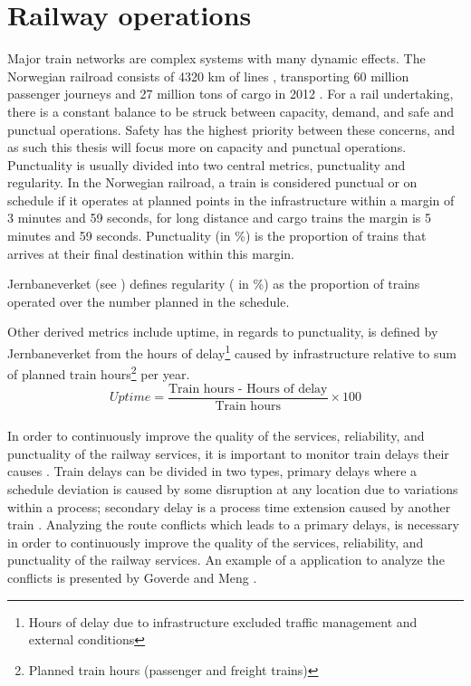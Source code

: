 
\section{Railway operations} %
\label{sec:railway_operations}
Major train networks are complex systems with many dynamic effects. The 
Norwegian railroad consists of 4320 km of lines 
\cite[p. 4]{jernbaneverketStatistikk}, transporting 60 million passenger 
journeys and 27 million tons of cargo in 2012
\cite[p. 9]{jernbaneverketStatistikk}. For a rail undertaking, there is a 
constant balance to be struck between capacity, demand, and safe and punctual 
operations. Safety has the highest priority between these concerns, and as 
such this thesis will focus more on capacity and punctual operations.\\

Punctuality is usually divided into two central metrics, punctuality and 
regularity. In the Norwegian railroad, a train is considered punctual or on 
schedule if it operates at planned points in the infrastructure within a 
margin of 3 minutes and 59 seconds, for long distance and cargo trains the 
margin is 5 minutes and 59 seconds. Punctuality (in \%) is the proportion of 
trains that arrives at their final destination within this margin.

Jernbaneverket (see ) defines regularity (
in \%) as the proportion of trains operated over the number planned in the 
schedule. 

Other derived metrics include uptime, in regards to punctuality, is defined by 
Jernbaneverket from 
the hours of delay\footnote{Hours of delay due to infrastructure excluded 
traffic	management and external conditions} caused by infrastructure relative 
to sum of planned train hours\footnote{Planned train hours (passenger and 
freight trains)} per year.\cite{jernbaneverketPunklighetsTall}
\begin{equation} \label{eq:uptime}
		Uptime =
		\frac
				{
					\text{Train hours - Hours of delay}
				}
				{
					\text{Train hours}
				}\times 100 
\end{equation}\\

In order to continuously improve the quality of the
services, reliability, and punctuality of the railway services, it is important
to monitor train delays their causes  \cite{goverde2011advanced}. 
Train delays can be divided in two types, primary delays where a schedule 
deviation is caused by some disruption at any location due to variations 
within a process; secondary delay is a process time extension caused by 
another train \cite{goverde2005punctuality}.
Analyzing the route conflicts which leads to a primary delays, is necessary in
order to continuously improve the quality of the services, reliability, and 
punctuality of the railway services. An example of a application to analyze the
conflicts is presented by Goverde and Meng \cite{goverde2011advanced}.\\

